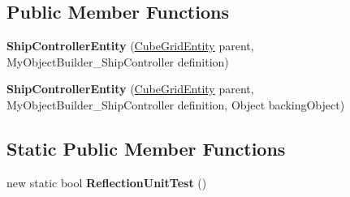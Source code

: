 \subsection*{Public Member Functions}
\begin{DoxyCompactItemize}
\item 
\hypertarget{class_s_e_mod_a_p_i_internal_1_1_a_p_i_1_1_entity_1_1_sector_1_1_sector_object_1_1_cube_grid_1_1fd05c9636f75dd22094d44c0d12591d7_a10451575f2de6604556750c4cee6a0e6}{}{\bfseries Ship\+Controller\+Entity} (\hyperlink{class_s_e_mod_a_p_i_internal_1_1_a_p_i_1_1_entity_1_1_sector_1_1_sector_object_1_1_cube_grid_entity}{Cube\+Grid\+Entity} parent, My\+Object\+Builder\+\_\+\+Ship\+Controller definition)\label{class_s_e_mod_a_p_i_internal_1_1_a_p_i_1_1_entity_1_1_sector_1_1_sector_object_1_1_cube_grid_1_1fd05c9636f75dd22094d44c0d12591d7_a10451575f2de6604556750c4cee6a0e6}

\item 
\hypertarget{class_s_e_mod_a_p_i_internal_1_1_a_p_i_1_1_entity_1_1_sector_1_1_sector_object_1_1_cube_grid_1_1fd05c9636f75dd22094d44c0d12591d7_a5720853b9d6f065158d22589d90c96f8}{}{\bfseries Ship\+Controller\+Entity} (\hyperlink{class_s_e_mod_a_p_i_internal_1_1_a_p_i_1_1_entity_1_1_sector_1_1_sector_object_1_1_cube_grid_entity}{Cube\+Grid\+Entity} parent, My\+Object\+Builder\+\_\+\+Ship\+Controller definition, Object backing\+Object)\label{class_s_e_mod_a_p_i_internal_1_1_a_p_i_1_1_entity_1_1_sector_1_1_sector_object_1_1_cube_grid_1_1fd05c9636f75dd22094d44c0d12591d7_a5720853b9d6f065158d22589d90c96f8}

\end{DoxyCompactItemize}
\subsection*{Static Public Member Functions}
\begin{DoxyCompactItemize}
\item 
\hypertarget{class_s_e_mod_a_p_i_internal_1_1_a_p_i_1_1_entity_1_1_sector_1_1_sector_object_1_1_cube_grid_1_1fd05c9636f75dd22094d44c0d12591d7_a878591bcabf83081ab1fd991ea59b5ee}{}new static bool {\bfseries Reflection\+Unit\+Test} ()\label{class_s_e_mod_a_p_i_internal_1_1_a_p_i_1_1_entity_1_1_sector_1_1_sector_object_1_1_cube_grid_1_1fd05c9636f75dd22094d44c0d12591d7_a878591bcabf83081ab1fd991ea59b5ee}

\end{DoxyCompactItemize}
